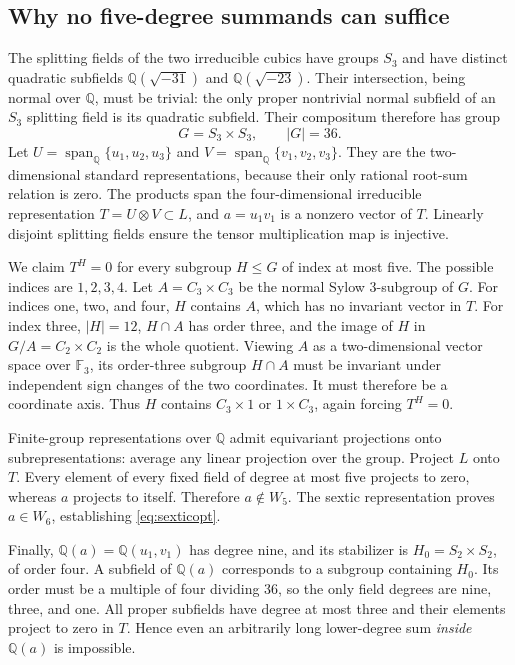 \documentclass[11pt,a4paper]{article}
\theoremstyle{definition}\newtheorem{definition}[theorem]{Definition}
\theoremstyle{remark}\newtheorem{remark}[theorem]{Remark}
\newcommand{\Q}{\mathbb Q}
\newcommand{\Span}{\operatorname{span}_{\Q}}
\begin{document}
\subsection{Why no five-degree summands can suffice}

The splitting fields of the two irreducible cubics have groups $S_3$ and
have distinct quadratic subfields $\Q(\sqrt{-31})$ and
$\Q(\sqrt{-23})$. Their intersection, being normal over $\Q$, must be
trivial: the only proper nontrivial normal subfield of an $S_3$ splitting
field is its quadratic subfield. Their compositum therefore has group
\[
 G=S_3\times S_3,\qquad |G|=36.
\]
Let $U=\Span\{u_1,u_2,u_3\}$ and
$V=\Span\{v_1,v_2,v_3\}$. They are the two-dimensional standard
representations, because their only rational root-sum relation is zero.
The products span the four-dimensional irreducible representation
$T=U\otimes V\subset L$, and $a=u_1v_1$ is a nonzero vector of $T$.
Linearly disjoint splitting fields ensure the tensor multiplication map is
injective.

We claim $T^H=0$ for every subgroup $H\le G$ of index at most five.
The possible indices are $1,2,3,4$. Let $A=C_3\times C_3$ be the normal
Sylow 3-subgroup of $G$. For indices one, two, and four, $H$ contains $A$,
which has no invariant vector in $T$. For index three, $|H|=12$,
$H\cap A$ has order three, and the image of $H$ in $G/A=C_2\times C_2$
is the whole quotient. Viewing $A$ as a two-dimensional vector space over
$\mathbb F_3$, its order-three subgroup $H\cap A$ must be invariant under
independent sign changes of the two coordinates. It must therefore be a
coordinate axis. Thus $H$ contains $C_3\times1$ or $1\times C_3$, again
forcing $T^H=0$.

Finite-group representations over $\Q$ admit equivariant projections onto
subrepresentations: average any linear projection over the group. Project
$L$ onto $T$. Every element of every fixed field of degree at most five
projects to zero, whereas $a$ projects to itself. Therefore $a\notin W_5$.
The sextic representation proves $a\in W_6$, establishing
\eqref{eq:sexticopt}.

Finally, $\Q(a)=\Q(u_1,v_1)$ has degree nine, and its stabilizer is
$H_0=S_2\times S_2$, of order four. A subfield of $\Q(a)$ corresponds
to a subgroup containing $H_0$. Its order must be a multiple of four
dividing 36, so the only field degrees are nine, three, and one. All proper
subfields have degree at most three and their elements project to zero in
$T$. Hence even an arbitrarily long lower-degree sum \emph{inside}
$\Q(a)$ is impossible.
\end{document}
